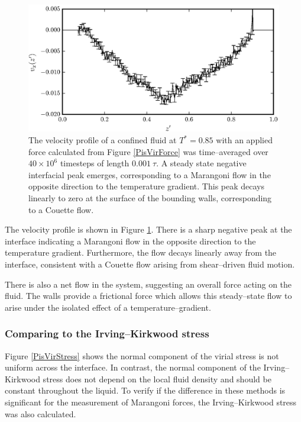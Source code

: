 \begin{figure}[h!]
\centering
\includegraphics[scale=1.0]{PisVirFlow}
\caption{The velocity profile of a confined fluid at $T^{*}=0.85$ with an applied force calculated from Figure \ref{PisVirForce} was time--averaged over $40 \times 10^{6}$ timesteps of length $0.001\ \tau$.
A steady state negative interfacial peak emerges, corresponding to a Marangoni flow in the opposite direction to the temperature gradient.
This peak decays linearly to zero at the surface of the bounding walls, corresponding to a Couette flow.}
\label{PisVirFlow}
\end{figure}
The velocity profile is shown in Figure \ref{PisVirFlow}. 
There is a sharp negative peak at the interface indicating a Marangoni flow in the opposite direction to the temperature gradient.
Furthermore, the flow decays linearly away from the interface, consistent with a Couette flow arising from shear--driven fluid motion.\cite{FluidMech}

There is also a net flow in the system, suggesting an overall force acting on the fluid.
The walls provide a frictional force which allows this steady--state flow to arise under the isolated effect of a temperature--gradient.
\FloatBarrier

\subsubsection{Comparing to the Irving--Kirkwood stress}
Figure \ref{PisVirStress} shows the normal component of the virial stress is not uniform across the interface.
In contrast, the normal component of the Irving--Kirkwood stress does not depend on the local fluid density and should be constant throughout the liquid.
To verify if the difference in these methods is significant for the measurement of Marangoni forces, the Irving--Kirkwood stress was also calculated.

